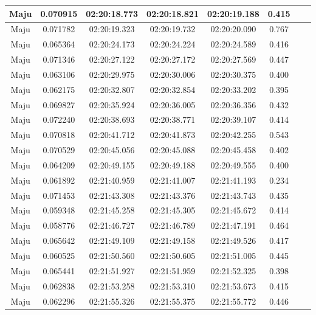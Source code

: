 \begin{longtable}{|c|c|c|c|c|c|c|c|}
      Maju & 0.070915 & 02:20:18.773 & 02:20:18.821 & 02:20:19.188 & 0.415 \\ \hline
      Maju & 0.071782 & 02:20:19.323 & 02:20:19.732 & 02:20:20.090 & 0.767 \\ \hline
      Maju & 0.065364 & 02:20:24.173 & 02:20:24.224  & 02:20:24.589  & 0.416 \\ \hline
      Maju & 0.071346 & 02:20:27.122 & 02:20:27.172 & 02:20:27.569 & 0.447 \\ \hline
      Maju & 0.063106 & 02:20:29.975 & 02:20:30.006 & 02:20:30.375 & 0.400 \\ \hline
      Maju & 0.062175 & 02:20:32.807 & 02:20:32.854 & 02:20:33.202 & 0.395 \\ \hline
      Maju & 0.069827 & 02:20:35.924 & 02:20:36.005 & 02:20:36.356 & 0.432 \\ \hline
      Maju & 0.072240 & 02:20:38.693 & 02:20:38.771 & 02:20:39.107 & 0.414 \\ \hline
      Maju & 0.070818 & 02:20:41.712 & 02:20:41.873 & 02:20:42.255 & 0.543 \\ \hline
      Maju & 0.070529 & 02:20:45.056 & 02:20:45.088 & 02:20:45.458 & 0.402 \\ \hline
      Maju & 0.064209 & 02:20:49.155 & 02:20:49.188 & 02:20:49.555 & 0.400 \\ \hline
      Maju & 0.061892 & 02:21:40.959 & 02:21:41.007 & 02:21:41.193 & 0.234 \\ \hline
      Maju & 0.071453 & 02:21:43.308 & 02:21:43.376  & 02:21:43.743 & 0.435 \\ \hline
      Maju & 0.059348 & 02:21:45.258 & 02:21:45.305 & 02:21:45.672 & 0.414 \\ \hline
      Maju & 0.058776 & 02:21:46.727 & 02:21:46.789  & 02:21:47.191 & 0.464 \\ \hline
      Maju & 0.065642 & 02:21:49.109 & 02:21:49.158 & 02:21:49.526 & 0.417 \\ \hline
      Maju & 0.060525 & 02:21:50.560 & 02:21:50.605 & 02:21:51.005 & 0.445 \\ \hline
      Maju & 0.065441 & 02:21:51.927 & 02:21:51.959  & 02:21:52.325 & 0.398 \\ \hline
      Maju & 0.062838 & 02:21:53.258 & 02:21:53.310 & 02:21:53.673 & 0.415 \\ \hline
      Maju & 0.062296 & 02:21:55.326 & 02:21:55.375 & 02:21:55.772 & 0.446 \\ \hline
\end{longtable}

